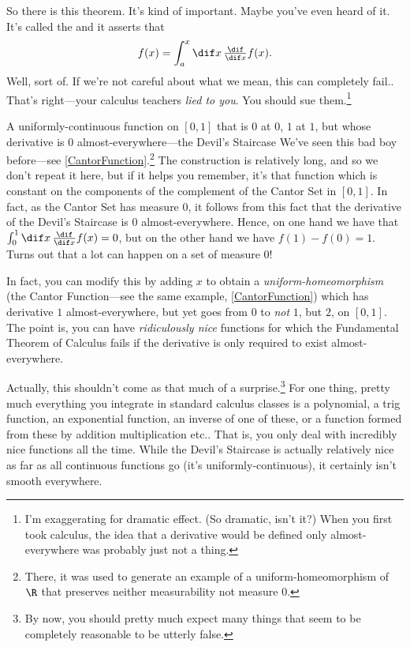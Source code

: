 So there is this theorem.  It's kind of important.  Maybe you've even heard of it.  It's called the  and it asserts that
\begin{equation}
f(x)=\int _a^x\dif x\, \tfrac{\dif}{\dif x}f(x).
\end{equation}
Well, sort of.  If we're not careful about what we mean, this can completely fail..  That's right---your calculus teachers \emph{lied to you}.  You should sue them.\footnote{I'm exaggerating for dramatic effect.  (So dramatic, isn't it?)  When you first took calculus, the idea that a derivative would be defined only almost-everywhere was probably just not a thing.}
\begin{exm}{A uniformly-continuous function on {$[0,1]$} that is $0$ at $0$, $1$ at $1$, but whose derivative is $0$ almost-everywhere---the Devil's Staircase}{}
We've seen this bad boy before---see \cref{CantorFunction}.\footnote{There, it was used to generate an example of a uniform-homeomorphism of $\R$ that preserves neither measurability not measure $0$.}  The construction is relatively long, and so we don't repeat it here, but if it helps you remember, it's that function which is constant on the components of the complement of the Cantor Set in $[0,1]$.  In fact, as the Cantor Set has measure $0$, it follows from this fact that the derivative of the Devil's Staircase is $0$ almost-everywhere.  Hence, on one hand we have that $\int _0^1\dif x\, \frac{\dif}{\dif x}f(x)=0$, but on the other hand we have $f(1)-f(0)=1$.  Turns out that a lot can happen on a set of measure $0$!

In fact, you can modify this by adding $x$ to obtain a \emph{uniform-homeomorphism} (the Cantor Function---see the same example, \cref{CantorFunction}) which has derivative $1$ almost-everywhere, but yet goes from $0$ to \emph{not} $1$, but $2$, on $[0,1]$.  The point is, you can have \emph{ridiculously nice} functions for which the Fundamental Theorem of Calculus fails if the derivative is only required to exist almost-everywhere.
\end{exm}
Actually, this shouldn't come as that much of a surprise.\footnote{By now, you should pretty much expect many things that seem to be completely reasonable to be utterly false.}  For one thing, pretty much everything you integrate in standard calculus classes is a polynomial, a trig function, an exponential function, an inverse of one of these, or a function formed from these by addition multiplication etc..  That is, you only deal with incredibly nice functions all the time.  While the Devil's Staircase is actually relatively nice as far as all continuous functions go (it's uniformly-continuous), it certainly isn't smooth everywhere.

